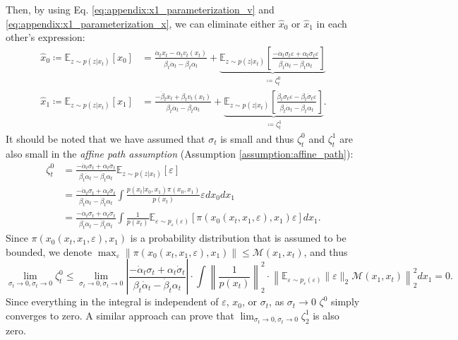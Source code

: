 Then, by using Eq. \ref{eq:appendix:x1_parameterization_v} and \ref{eq:appendix:x1_parameterization_x}, we can eliminate either $\hat{x}_0$ or $\hat{x}_1$ in each other's expression:
\begin{align}
    \hat{x}_0 \coloneqq \mathbb{E}_{z\sim p(z|x_t)}[x_0] & = 
    \frac{\dot\alpha_t x_t - \alpha_t v_t(x_t)}{\beta_t\dot\alpha_t - \dot\beta_t\alpha_t}
    +
    \underbrace{\mathbb{E}_{z\sim p(z|x_t)}\left[
    \frac{-\dot\alpha_t\sigma_t\varepsilon + \alpha_t\dot\sigma_t\varepsilon}{\beta_t\dot\alpha_t - \dot\beta_t\alpha_t}
    \right]}_{\coloneqq \zeta^0_t}
    \\
    \hat{x}_1 \coloneqq \mathbb{E}_{z\sim p(z|x_t)}[x_1] & = 
    \frac{-\dot\beta_t x_t + \beta_t v_t(x_t)}{\beta_t\dot\alpha_t - \dot\beta_t\alpha_t} + \underbrace{\mathbb{E}_{z\sim p(z|x_t)}\left[
    \frac{\dot\beta_t\sigma_t\varepsilon - \beta_t\dot\sigma_t\varepsilon}{\beta_t\dot\alpha_t - \dot\beta_t\alpha_t}
    \right]}_{\coloneqq \zeta^1_t}.
\end{align}
It should be noted that we have assumed that $\sigma_t$ is small and thus $\zeta_t^0$ and $\zeta_t^1$ are also small in the \emph{affine path assumption} (Assumption \ref{assumption:affine_path}):
\begin{align}
    \nonumber \zeta_t^0 &= \frac{-\dot\alpha_t\sigma_t + \alpha_t\dot\sigma_t}{\beta_t\dot\alpha_t - \dot\beta_t\alpha_t}\mathbb{E}_{z\sim p(z|x_t)}[\varepsilon] \\
    \nonumber &=\frac{-\dot\alpha_t\sigma_t + \alpha_t\dot\sigma_t}{\beta_t\dot\alpha_t - \dot\beta_t\alpha_t}
    \int \frac{p(x_t|x_0,x_1)\pi(x_0,x_1)}{p(x_t)}\varepsilon dx_0dx_1 \\
    &=\frac{-\dot\alpha_t\sigma_t + \alpha_t\dot\sigma_t}{\beta_t\dot\alpha_t - \dot\beta_t\alpha_t}\int\frac{1}{p(x_t)}
    \mathbb{E}_{\varepsilon\sim p_{\varepsilon}(\varepsilon)} \left[
    \pi(x_0(x_t,x_1,\varepsilon),x_1)\varepsilon \right] dx_1.
\end{align}
Since $\pi(x_0(x_t,x_1,\varepsilon),x_1)$ is a probability distribution that is assumed to be bounded, we denote $\max_{\varepsilon}\|\pi(x_0(x_t,x_1,\varepsilon),x_1)\|\le \mathcal{M}(x_1,x_t)$, and thus 
\begin{equation}
    \lim_{\sigma_t\rightarrow 0, \dot\sigma_t\rightarrow 0}\zeta_t^0
    \le\lim_{\sigma_t\rightarrow 0, \dot\sigma_t\rightarrow 0}\left|\frac{-\dot\alpha_t\sigma_t + \alpha_t\dot\sigma_t}{\beta_t\dot\alpha_t - \dot\beta_t\alpha_t}\right|\cdot \int 
    \left\|
    \frac{1}{p(x_t)}
    \right\|_2^2
    \cdot
    \left\|
    \mathbb{E}_{\varepsilon\sim p_{\varepsilon}(\varepsilon)}
    \|\varepsilon\|_2
    \mathcal{M}(x_1,x_t)
    \right\|_2^2dx_1 = 0.
\end{equation}
Since everything in the integral is independent of $\varepsilon$, $x_0$, or $\sigma_t$, as $\sigma_t\rightarrow 0$ $\zeta^0$ simply converges to zero. A similar approach can prove that $\lim_{\sigma_t\rightarrow 0, \dot\sigma_t\rightarrow 0}\zeta_2^1$ is also zero.

